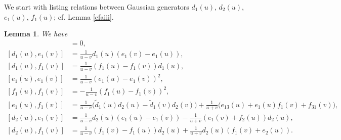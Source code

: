 \documentclass[11pt,reqno]{amsart}
\numberwithin{equation}{section}
\newtheorem{lem}[thm]{Lemma}
\theoremstyle{definition}
\theoremstyle{remark}
\newcommand{\tl}{\tilde}
\begin{document}
We start with listing relations between Gaussian generators $d_1(u)$, $d_2(u)$, $e_1(u)$, $f_1(u)$; cf. Lemma \ref{efaiii}.
\begin{lem}
We have 
\begin{align}
[d_i(u),d_j(v)]&=0,\label{ddb3}\\
[d_1(u),e_1(v)]&=\frac{1}{u-v}d_1(u)(e_1(v)-e_1(u)),\label{d1e1b3}\\
[d_1(u),f_1(v)]&=\frac{1}{u-v}(f_1(u)-f_1(v))d_1(u),\label{d1f1b3}\\
[e_1(u),e_1(v)]&=\frac{1}{u-v}(e_1(u)-e_1(v))^2,\label{e1e1b3}\\
[f_1(u),f_1(v)]&=-\frac{1}{u-v}(f_1(u)-f_1(v))^2,\label{f1f1b3}\\
[e_1(u),f_1(v)]&=\frac{1}{u-v}\big(\tl d_1(u)d_2(u)-\tl d_1(v)d_2(v)\big)+\frac{1}{u+v}\big(e_{13}(u)+e_1(u)f_1(v)+f_{31}(v)\big),\label{e1f1b3}\\
[d_2(u),e_1(v)]&=\frac{1}{u-v}d_2(u)(e_1(u)-e_1(v))-\frac{1}{u+v}(e_1(v)+f_2(u))d_2(u),\label{d2e1b3}\\
[d_2(u),f_1(v)]&=\frac{1}{u-v}(f_1(v)-f_1(u))d_2(u)+\frac{1}{u+v}d_2(u)(f_1(v)+e_2(u)).\label{d2f1b3}
\end{align}
\end{lem}
\end{document}
